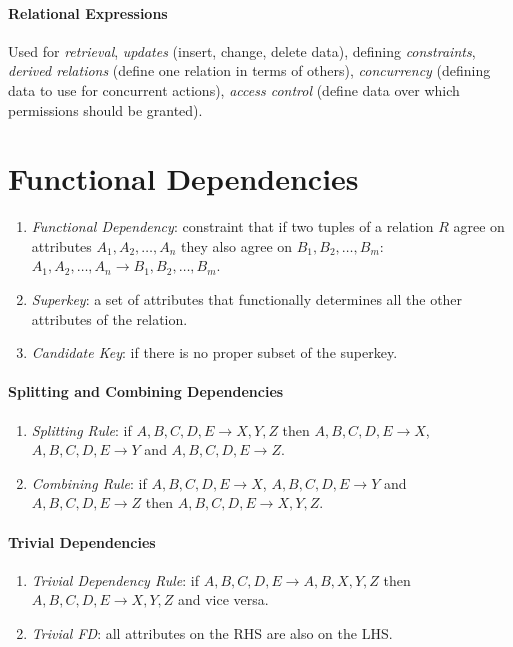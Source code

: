 \documentclass[twocolumn,english]{article}
\begin{document}
\paragraph{Relational Expressions}

Used for \emph{retrieval}, \emph{updates} (insert, change, delete
data), defining \emph{constraints}, \emph{derived relations} (define
one relation in terms of others), \emph{concurrency} (defining data
to use for concurrent actions), \emph{access control} (define data
over which permissions should be granted).


\section{Functional Dependencies}
\begin{enumerate}
\item \emph{Functional Dependency}: constraint that if two tuples of a relation
$R$ agree on attributes $A_{1},A_{2},\dots,A_{n}$ they also agree
on $B_{1},B_{2},\dots,B_{m}$: $A_{1},A_{2},\dots,A_{n}\rightarrow B_{1},B_{2},\dots,B_{m}$. 
\item \emph{Superkey}: a set of attributes that functionally determines
all the other attributes of the relation. 
\item \emph{Candidate Key}: if there is no proper subset of the superkey. 
\end{enumerate}

\paragraph{Splitting and Combining Dependencies}
\begin{enumerate}
\item \emph{Splitting Rule}: if $A,B,C,D,E\rightarrow X,Y,Z$ then $A,B,C,D,E\rightarrow X$,
$A,B,C,D,E\rightarrow Y$ and $A,B,C,D,E\rightarrow Z$. 
\item \emph{Combining Rule}: if $A,B,C,D,E\rightarrow X$, $A,B,C,D,E\rightarrow Y$
and $A,B,C,D,E\rightarrow Z$ then $A,B,C,D,E\rightarrow X,Y,Z$. 
\end{enumerate}

\paragraph{Trivial Dependencies}
\begin{enumerate}
\item \emph{Trivial Dependency Rule}: if $A,B,C,D,E\rightarrow A,B,X,Y,Z$
then $A,B,C,D,E\rightarrow X,Y,Z$ and vice versa. 
\item \emph{Trivial FD}: all attributes on the RHS are also on the LHS. 
\end{enumerate}
\end{document}
